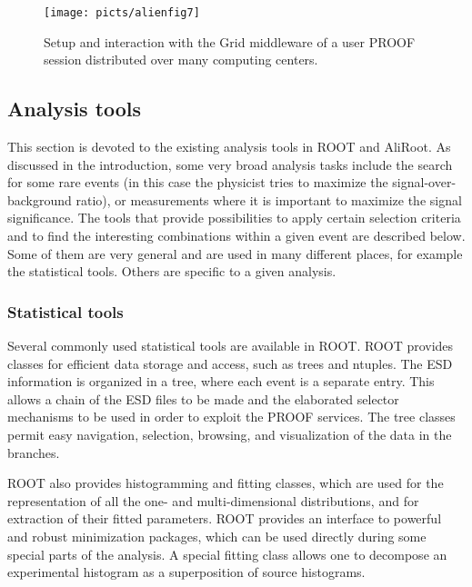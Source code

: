 \documentclass[12pt,a4paper,twoside]{article}
\makeatletter
\newcommand {\grid} {Grid\@\xspace}
\newcommand {\aliroot} {AliRoot\@\xspace}
\newcommand {\ROOT} {ROOT\@\xspace}
\makeatother
\begin{document}
{\begin{figure}[t]
  \centering
  \texttt{[image: picts/alienfig7]}
  \caption{Setup and interaction with the \grid middleware of a user 
    PROOF session distributed over many computing centers.} 
  \label{CH3Fig:alienfig7}
\end{figure}


\subsection{Analysis tools}

This section is devoted to the existing analysis tools in \ROOT and
\aliroot. As discussed in the introduction, some very broad
analysis tasks include the search for some rare events (in this case the
physicist tries to maximize the signal-over-background ratio), or
measurements where it is important to maximize the signal
significance. The tools that provide possibilities to apply certain
selection criteria and to find the interesting combinations within
a given event are described below. Some of them are very general and are
used in many different places, for example the statistical
tools. Others are specific to a given analysis.

\subsubsection{Statistical tools}

Several commonly used statistical tools are available in
\ROOT\cite{ROOT}. \ROOT provides 
classes for efficient data storage and access, such as trees
and ntuples. The
ESD information is organized in a tree, where each event is a separate
entry. This allows a chain of the ESD files to be made and the
elaborated selector mechanisms to be used in order to exploit the PROOF
services. The tree classes
permit easy navigation, selection, browsing, and visualization of the
data in the branches. 

\ROOT also provides histogramming and fitting classes, which are used 
for the representation of all the one- and multi-dimensional
distributions, and for extraction of their fitted parameters. \ROOT provides
an interface to powerful and robust minimization packages, which can be 
used directly during some special parts of the analysis. A special
fitting class allows one to decompose an experimental histogram as a
superposition of source histograms.

}
\end{document}
